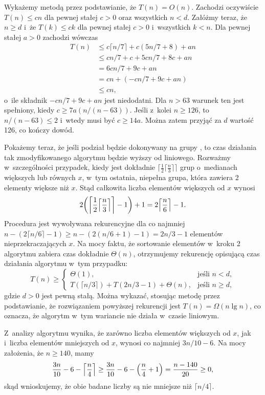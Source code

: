 Wykażemy metodą przez podstawianie, że $T(n)=O(n)$. Zachodzi oczywiście $T(n)\le cn$ dla pewnej stałej $c>0$ oraz wszystkich $n<d$. Załóżmy teraz, że $n\ge d$ i~że $T(k)\le ck$ dla pewnej stałej $c>0$ i~wszystkich $k<n$. Dla pewnej stałej $a>0$ zachodzi wówczas
\begin{align*}
	T(n) &\le c\lceil n/7\rceil+c(5n/7+8)+an \\
	&\le cn/7+c+5cn/7+8c+an \\
	&= 6cn/7+9c+an \\
	&= cn+(-cn/7+9c+an) \\
	&\le cn,
\end{align*}
o~ile składnik $-cn/7+9c+an$ jest niedodatni. Dla $n>63$ warunek ten jest spełniony, kiedy $c\ge7a(n/(n-63))$. Jeśli z~kolei $n\ge126$, to $n/(n-63)\le2$ i~wtedy musi być $c\ge14a$. Można zatem przyjąć za $d$ wartość 126, co kończy dowód.

Pokażemy teraz, że jeśli podział będzie dokonywany na grupy , to czas działania tak zmodyfikowanego algorytmu  będzie wyższy od liniowego. Rozważmy w~szczególności przypadek, kiedy jest dokładnie $\bigl\lceil\frac{1}{2}\bigl\lceil\frac{n}{3}\bigr\rceil\bigr\rceil$ grup o~medianach większych lub równych $x$, w~tym ostatnia, niepełna grupa, która zawiera 2 elementy większe niż $x$. Stąd całkowita liczba elementów większych od $x$ wynosi
\[
	2\biggl(\biggl\lceil\frac{1}{2}\Bigl\lceil\frac{n}{3}\Bigr\rceil\biggr\rceil-1\biggr)+1 = 2\Bigl\lceil\frac{n}{6}\Bigr\rceil-1.
\]
Procedura jest wywoływana rekurencyjne dla co najmniej $n-(2\lceil n/6\rceil-1)\ge n-(2(n/6+1)-1)=2n/3-1$ elementów nieprzekraczających $x$. Na mocy faktu, że sortowanie elementów w~kroku 2 algorytmu  zabiera czas dokładnie $\Theta(n)$, otrzymujemy rekurencję opisującą czas działania algorytmu w~tym przypadku:
\[
	T(n) \ge \begin{cases}
		\Theta(1), & \text{jeśli $n<d$}, \\
		T(\lceil n/3\rceil)+T(2n/3-1)+\Theta(n), & \text{jeśli $n\ge d$},
	\end{cases}
\]
gdzie $d>0$ jest pewną stałą. Można wykazać, stosując metodę przez podstawianie, że rozwiązaniem powyższej rekurencji jest $T(n)=\Omega(n\lg n)$, co oznacza, że algorytm w~tym wariancie nie działa w~czasie liniowym.

\exercise %
Z~analizy algorytmu  wynika, że zarówno liczba elementów większych od $x$, jak i~liczba elementów mniejszych od $x$, wynosi co najmniej $3n/10-6$. Na mocy założenia, że $n\ge140$, mamy
\[
	\frac{3n}{10}-6-\Bigl\lceil\frac{n}{4}\Bigr\rceil \ge \frac{3n}{10}-6-\Bigl(\frac{n}{4}+1\Bigr) = \frac{n-140}{20} \ge 0,
\]
skąd wnioskujemy, że obie badane liczby są nie mniejsze niż $\lceil n/4\rceil$.

